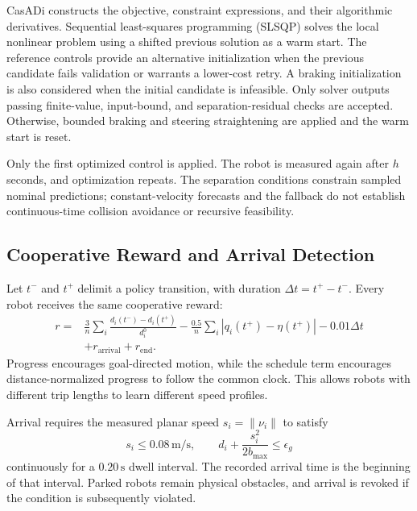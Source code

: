 CasADi constructs the objective, constraint expressions, and their algorithmic
derivatives. Sequential least-squares programming (SLSQP) solves the local
nonlinear problem using a shifted previous solution as a warm start. The
reference controls provide an alternative initialization when the previous
candidate fails validation or warrants a lower-cost retry. A braking
initialization is also considered when the initial candidate is infeasible.
Only solver outputs passing finite-value, input-bound, and separation-residual
checks are accepted. Otherwise, bounded braking and steering straightening
are applied and the warm start is reset.

Only the first optimized control is applied. The robot is measured again
after $h$ seconds, and optimization repeats. The separation conditions constrain
sampled nominal predictions; constant-velocity forecasts and the fallback do
not establish continuous-time collision avoidance or recursive feasibility.

\subsection{Cooperative Reward and Arrival Detection}

Let $t^-$ and $t^+$ delimit a policy transition, with duration
$\Delta t=t^+-t^-$. Every robot receives the same cooperative reward:
\begin{equation}
\begin{aligned}
    r={}&\frac{3}{n}\sum_i\frac{d_i(t^-)-d_i(t^+)}{d_i^0}
       -\frac{0.5}{n}\sum_i|q_i(t^+)-\eta(t^+)|
       -0.01\Delta t\\
       &+r_{\mathrm{arrival}}+r_{\mathrm{end}}.
\end{aligned}
\end{equation}
Progress encourages goal-directed motion, while the schedule term encourages
distance-normalized progress to follow the common clock. This allows robots
with different trip lengths to learn different speed profiles.

Arrival requires the measured planar speed $s_i=\|\nu_i\|$ to satisfy
\begin{equation}
    s_i\leq0.08\,\mathrm{m/s},
    \qquad d_i+\frac{s_i^2}{2b_{\max}}\leq\epsilon_g
\end{equation}
continuously for a $0.20\,\mathrm{s}$ dwell interval. The recorded arrival
time is the beginning of that interval. Parked robots remain physical
obstacles, and arrival is revoked if the condition is subsequently violated.

